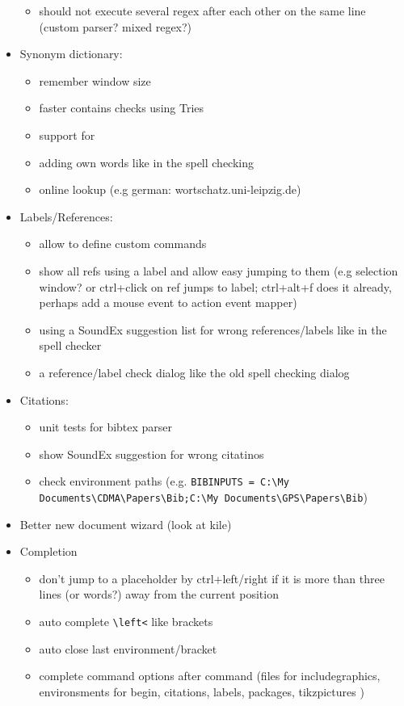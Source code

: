 \documentclass[10pt,a4paper,landscape]{report}
\begin{document}
\begin{itemize}
\begin{itemize}
		\item should not execute several regex after each other on the same line (custom parser? mixed regex?)	
	\end{itemize}
	\item Synonym dictionary: \begin{itemize}
		\item remember window size
		\item faster contains checks using Tries
		\item support for 
		\item adding own words like in the spell checking 
		\item online lookup (e.g german: wortschatz.uni-leipzig.de)
	\end{itemize}
	\item Labels/References: \begin{itemize}
		\item allow to define custom commands
		\item 	show all refs using a label and allow easy jumping to them (e.g selection window? or ctrl+click on ref jumps to label; ctrl+alt+f does it already, perhaps add a mouse event to action event mapper)
		\item using a SoundEx suggestion list for wrong references/labels like in the spell checker
		\item a reference/label check dialog like the old spell checking dialog
	\end{itemize}
	\item Citations: \begin{itemize}
		\item unit tests for bibtex parser
		\item show SoundEx suggestion for wrong citatinos
		\item check environment paths (e.g. \verb+BIBINPUTS = C:\My Documents\CDMA\Papers\Bib;C:\My Documents\GPS\Papers\Bib+)
	\end{itemize}
	\item Better new document wizard (look at kile)
	\item Completion \begin{itemize}
	\item don't jump to a placeholder by ctrl+left/right if it is more than three lines (or words?) away from the current position
	\item auto complete \verb+\left<+ like brackets
	\item auto close last environment/bracket
	\item complete command options after command (files for includegraphics, environsments for begin, citations, labels, packages, tikzpictures	)

\end{itemize}
\end{itemize}
\end{document}
